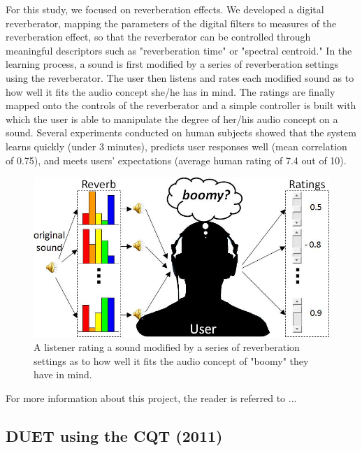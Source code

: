 \documentclass{article}
\begin{document}
For this study, we focused on reverberation effects. We developed a digital reverberator, mapping the parameters of the digital filters to measures of the reverberation effect, so that the reverberator can be controlled through meaningful descriptors such as "reverberation time" or "spectral centroid." In the learning process, a sound is first modified by a series of reverberation settings using the reverberator. The user then listens and rates each modified sound as to how well it fits the audio concept she/he has in mind. The ratings are finally mapped onto the controls of the reverberator and a simple controller is built with which the user is able to manipulate the degree of her/his audio concept on a sound. Several experiments conducted on human subjects showed that the system learns quickly (under 3 minutes), predicts user responses well (mean correlation of 0.75), and meets users' expectations (average human rating of 7.4 out of 10).

\begin{figure}[htb]
\centering
\includegraphics[width=\columnwidth]{Images/reverberation.jpg}
\caption{A listener rating a sound modified by a series of reverberation settings as to how well it fits the audio concept of "boomy" they have in mind.}
\label{fig:reverb}
\end{figure}

For more information about this project, the reader is referred to ...


\subsection{DUET using the CQT (2011)}
\label{ssec:duet}
\end{document}
